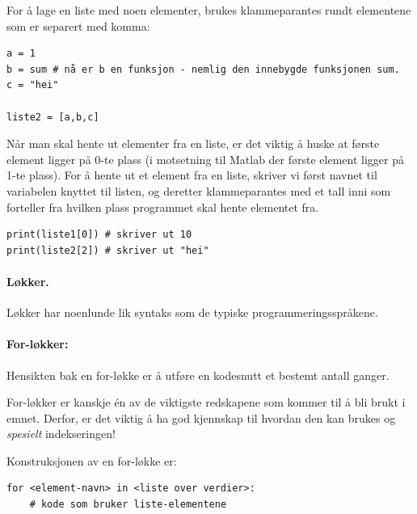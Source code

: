 \documentclass[%
oneside,                 %
final,                   %
10pt]{article}
\begin{document}
For å lage en liste med noen elementer, brukes klammeparantes rundt elementene som er separert med komma:

\begin{verbatim}
a = 1
b = sum # nå er b en funksjon - nemlig den innebygde funksjonen sum.
c = "hei"

liste2 = [a,b,c]
\end{verbatim}

Når man skal hente ut elementer fra en liste, er det viktig å huske at første element ligger på 0-te plass (i motsetning til Matlab der første element ligger på 1-te plass).
For å hente ut et element fra en liste, skriver vi først navnet til variabelen knyttet til listen, og deretter klammeparantes med et tall inni som forteller fra hvilken plass programmet skal hente elementet fra.
\begin{verbatim}
print(liste1[0]) # skriver ut 10
print(liste2[2]) # skriver ut "hei"
\end{verbatim}

\paragraph{Løkker.}
Løkker har noenlunde lik syntaks som de typiske programmeringsspråkene.



\vspace{3mm}


\paragraph{For-løkker:}


\vspace{3mm}


Hensikten bak en for-løkke er å utføre en kodesnutt et bestemt antall ganger.

For-løkker er kanskje én av de viktigste redskapene som kommer til å bli brukt i emnet.
Derfor, er det viktig å ha god kjennskap til hvordan den kan brukes og \emph{spesielt} indekseringen!

Konstruksjonen av en for-løkke er:
\begin{verbatim}
for <element-navn> in <liste over verdier>:
    # kode som bruker liste-elementene
\end{verbatim}
\end{document}
